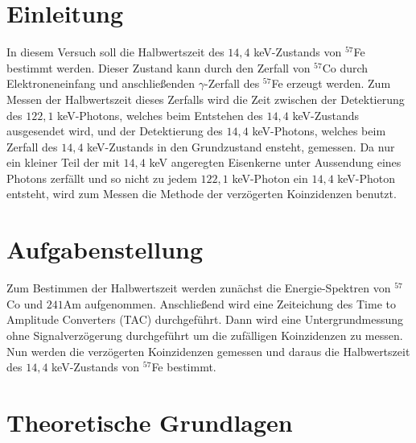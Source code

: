 \documentclass[12pt]{article}
\title{\vspace{0cm}{\Huge Fortgeschrittenen-Praktikum I:\\ \vspace{1cm} Kurze Halbwertszeiten}}
\author{Saskia Bondza\\Simon Stephan}
\date{Durchgeführt am 02.09.2016 und 05.09.2016}
\begin{document}
\maketitle
\newpage

\thispagestyle{empty}
\tableofcontents
\newpage

\section{Einleitung}


In diesem Versuch soll die Halbwertszeit des $14,4$ keV-Zustands von $^{57}$Fe bestimmt werden. Dieser Zustand kann durch den Zerfall von $^{57}$Co durch Elektroneneinfang und anschließenden $\gamma$-Zerfall des $^{57}$Fe erzeugt werden. Zum Messen der Halbwertszeit dieses Zerfalls wird die Zeit zwischen der Detektierung des $122,1$ keV-Photons, welches beim Entstehen des $14,4$ keV-Zustands ausgesendet wird, und der Detektierung des $14,4$ keV-Photons, welches beim Zerfall des $14,4$ keV-Zustands in den Grundzustand ensteht, gemessen. Da nur ein kleiner Teil der mit $14,4$ keV angeregten Eisenkerne unter Aussendung eines Photons zerfällt und so nicht zu jedem $122,1$ keV-Photon ein $14,4$ keV-Photon entsteht, wird zum Messen die Methode der verzögerten Koinzidenzen benutzt.




\newpage
\section[Aufgabenstellung]{Aufgabenstellung}%
Zum Bestimmen der Halbwertszeit werden zunächst die Energie-Spektren von $^57$Co und $241$Am aufgenommen. Anschließend wird eine Zeiteichung des Time to Amplitude Converters (TAC) durchgeführt. Dann wird eine Untergrundmessung ohne Signalverzögerung durchgeführt um die zufälligen Koinzidenzen zu messen. Nun werden die verzögerten Koinzidenzen gemessen und daraus die Halbwertszeit des $14,4$ keV-Zustands von $^{57}$Fe bestimmt.





\newpage
\section{Theoretische Grundlagen}
\end{document}
